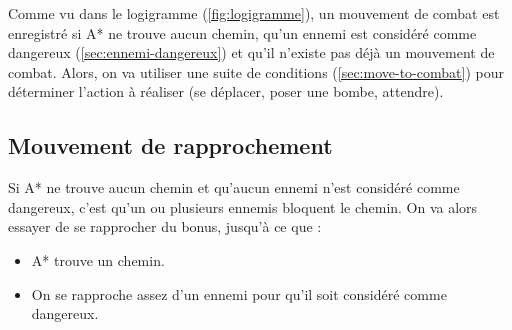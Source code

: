 Comme vu dans le logigramme (\autoref{fig:logigramme}), un mouvement de combat est enregistré si A* ne trouve aucun chemin, qu'un ennemi est considéré comme dangereux (\autoref{sec:ennemi-dangereux}) et qu'il n'existe pas déjà un mouvement de combat.
Alors, on va utiliser une suite de conditions (\autoref{sec:move-to-combat}) pour déterminer l'action à réaliser (se déplacer, poser une bombe, attendre).

\subsection{Mouvement de rapprochement}

Si A* ne trouve aucun chemin et qu'aucun ennemi n'est considéré comme dangereux, c'est qu'un ou plusieurs ennemis bloquent le chemin.
On va alors essayer de se rapprocher du bonus, jusqu'à ce que : 
\begin{itemize}
    \item A* trouve un chemin.
    \item On se rapproche assez d'un ennemi pour qu'il soit considéré comme dangereux.
\end{itemize}